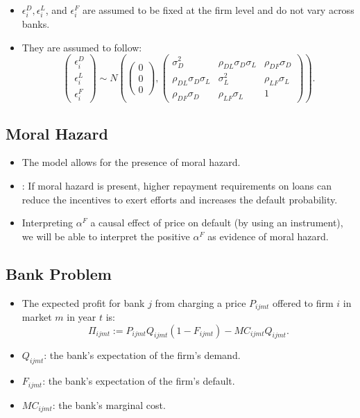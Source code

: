 \documentclass[
]{book}
\providecommand{\tightlist}{%
  \setlength{\itemsep}{0pt}\setlength{\parskip}{0pt}}
\begin{document}
\begin{itemize}
\tightlist
\item
  \(\epsilon_i^D, \epsilon_i^L\), and \(\epsilon_i^F\) are assumed to be fixed at the firm level and do not vary across banks.
\item
  They are assumed to follow:
  \[
  \begin{pmatrix}
  \epsilon_i^D\\
  \epsilon_i^L\\
  \epsilon_i^F
  \end{pmatrix}
  \sim
  N
  \left( 
  \begin{pmatrix}
  0 \\
  0 \\
  0
  \end{pmatrix},
  \begin{pmatrix}
  \sigma_D^2 & \rho_{DL} \sigma_D \sigma_L & \rho_{DF} \sigma_D\\
  \rho_{DL} \sigma_D \sigma_L & \sigma_L^2 & \rho_{LF} \sigma_L\\
  \rho_{DF} \sigma_D & \rho_{LF} \sigma_L & 1
  \end{pmatrix}
  \right).
  \]
\end{itemize}

\hypertarget{moral-hazard}{%
\subsection{Moral Hazard}\label{moral-hazard}}

\begin{itemize}
\tightlist
\item
  The model allows for the presence of moral hazard.
\item
  \citet{holmstromFinancialIntermediationLoanable1997}: If moral hazard is present, higher repayment requirements on loans can reduce the incentives to exert efforts and increases the default probability.
\item
  Interpreting \(\alpha^F\) a causal effect of price on default (by using an instrument), we will be able to interpret the positive \(\alpha^F\) as evidence of moral hazard.
\end{itemize}

\hypertarget{bank-problem}{%
\subsection{Bank Problem}\label{bank-problem}}

\begin{itemize}
\tightlist
\item
  The expected profit for bank \(j\) from charging a price \(P_{ijmt}\) offered to firm \(i\) in market \(m\) in year \(t\) is:
  \[
  \Pi_{ijmt} := P_{ijmt} Q_{ijmt} (1 - F_{ijmt}) - MC_{ijmt} Q_{ijmt}.
  \]
\item
  \(Q_{ijmt}\): the bank's expectation of the firm's demand.
\item
  \(F_{ijmt}\): the bank's expectation of the firm's default.
\item
  \(MC_{ijmt}\): the bank's marginal cost.
\end{itemize}
\end{document}
